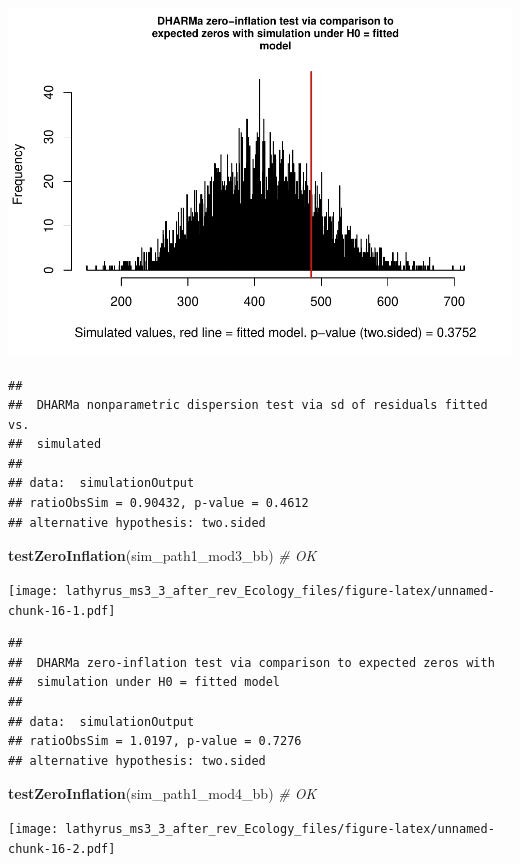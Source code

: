 \documentclass[
]{article}
\newenvironment{Shaded}{\begin{snugshade}}{\end{snugshade}}
\newcommand{\CommentTok}[1]{\textcolor[rgb]{0.56,0.35,0.01}{\textit{#1}}}
\newcommand{\KeywordTok}[1]{\textcolor[rgb]{0.13,0.29,0.53}{\textbf{#1}}}
\newcommand{\NormalTok}[1]{#1}
\begin{document}
\includegraphics{lathyrus_ms3_3_after_rev_Ecology_files/figure-latex/unnamed-chunk-15-2.pdf}

\begin{verbatim}
## 
##  DHARMa nonparametric dispersion test via sd of residuals fitted vs.
##  simulated
## 
## data:  simulationOutput
## ratioObsSim = 0.90432, p-value = 0.4612
## alternative hypothesis: two.sided
\end{verbatim}

\begin{Shaded}
\begin{Highlighting}[]
\KeywordTok{testZeroInflation}\NormalTok{(sim\_path1\_mod3\_bb) }\CommentTok{\# OK}
\end{Highlighting}
\end{Shaded}

\texttt{[image: lathyrus\_ms3\_3\_after\_rev\_Ecology\_files/figure-latex/unnamed-chunk-16-1.pdf]}

\begin{verbatim}
## 
##  DHARMa zero-inflation test via comparison to expected zeros with
##  simulation under H0 = fitted model
## 
## data:  simulationOutput
## ratioObsSim = 1.0197, p-value = 0.7276
## alternative hypothesis: two.sided
\end{verbatim}

\begin{Shaded}
\begin{Highlighting}[]
\KeywordTok{testZeroInflation}\NormalTok{(sim\_path1\_mod4\_bb) }\CommentTok{\# OK}
\end{Highlighting}
\end{Shaded}

\texttt{[image: lathyrus\_ms3\_3\_after\_rev\_Ecology\_files/figure-latex/unnamed-chunk-16-2.pdf]}
\end{document}
